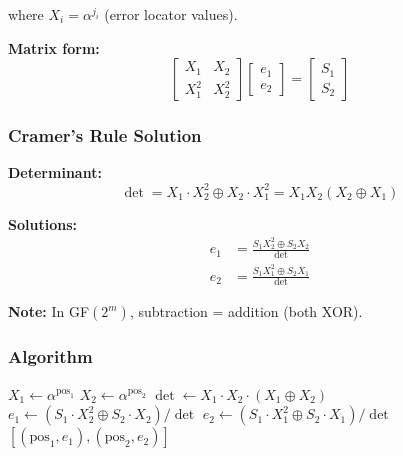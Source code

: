 \documentclass[11pt,a4paper]{article}
\begin{document}
where $X_i = \alpha^{j_i}$ (error locator values).

\textbf{Matrix form:}
\begin{equation}
\begin{bmatrix} X_1 & X_2 \\ X_1^2 & X_2^2 \end{bmatrix}
\begin{bmatrix} e_1 \\ e_2 \end{bmatrix} =
\begin{bmatrix} S_1 \\ S_2 \end{bmatrix}
\end{equation}

\subsubsection{Cramer's Rule Solution}

\textbf{Determinant:}
\begin{equation}
\det = X_1 \cdot X_2^2 \oplus X_2 \cdot X_1^2 = X_1 X_2 (X_2 \oplus X_1)
\end{equation}

\textbf{Solutions:}
\begin{align}
e_1 &= \frac{S_1 X_2^2 \oplus S_2 X_2}{\det} \\
e_2 &= \frac{S_1 X_1^2 \oplus S_2 X_1}{\det}
\end{align}

\textbf{Note:} In GF$(2^m)$, subtraction = addition (both XOR).

\subsubsection{Algorithm}

\begin{algorithm}[H]
\caption{Brute-Force 2-Error Decoder}
\begin{algorithmic}[1]
        \State $X_1 \gets \alpha^{\text{pos}_1}$
        \State $X_2 \gets \alpha^{\text{pos}_2}$
        \State $\det \gets X_1 \cdot X_2 \cdot (X_1 \oplus X_2)$
            \State $e_1 \gets (S_1 \cdot X_2^2 \oplus S_2 \cdot X_2) / \det$
            \State $e_2 \gets (S_1 \cdot X_1^2 \oplus S_2 \cdot X_1) / \det$
                \State \Return $[(\text{pos}_1, e_1), (\text{pos}_2, e_2)]$
            \EndIf
        \EndIf
    \EndFor
\EndFor
\end{algorithmic}
\end{algorithm}
\end{document}

